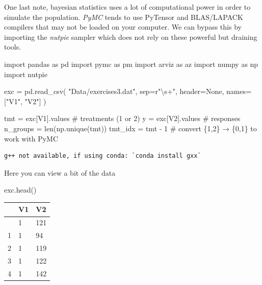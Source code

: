 \documentclass[
  letterpaper,
  DIV=11,
  numbers=noendperiod]{scrartcl}
\newenvironment{Shaded}{\begin{snugshade}}{\end{snugshade}}
\newcommand{\BuiltInTok}[1]{\textcolor[rgb]{0.00,0.23,0.31}{#1}}
\newcommand{\CommentTok}[1]{\textcolor[rgb]{0.37,0.37,0.37}{#1}}
\newcommand{\DecValTok}[1]{\textcolor[rgb]{0.68,0.00,0.00}{#1}}
\newcommand{\ImportTok}[1]{\textcolor[rgb]{0.00,0.46,0.62}{#1}}
\newcommand{\NormalTok}[1]{\textcolor[rgb]{0.00,0.23,0.31}{#1}}
\newcommand{\OperatorTok}[1]{\textcolor[rgb]{0.37,0.37,0.37}{#1}}
\newcommand{\StringTok}[1]{\textcolor[rgb]{0.13,0.47,0.30}{#1}}
\newcommand{\VariableTok}[1]{\textcolor[rgb]{0.07,0.07,0.07}{#1}}
\newcommand{\VerbatimStringTok}[1]{\textcolor[rgb]{0.13,0.47,0.30}{#1}}
\newcounter{none} %
\begin{document}
One last note, bayesian statistics uses a lot of computational power in
order to simulate the population. \emph{PyMC} tends to use PyTensor and
BLAS/LAPACK compilers that may not be loaded on your computer. We can
bypass this by importing the \emph{nutpie} sampler which does not rely
on these powerful but draining tools.

\begin{Shaded}
\begin{Highlighting}[]
\ImportTok{import}\NormalTok{ pandas }\ImportTok{as}\NormalTok{ pd}
\ImportTok{import}\NormalTok{ pymc }\ImportTok{as}\NormalTok{ pm}
\ImportTok{import}\NormalTok{ arviz }\ImportTok{as}\NormalTok{ az}
\ImportTok{import}\NormalTok{ numpy }\ImportTok{as}\NormalTok{ np}
\ImportTok{import}\NormalTok{ nutpie}


\NormalTok{exc }\OperatorTok{=}\NormalTok{ pd.read\_csv(}
    \StringTok{"Data/exercises3.dat"}\NormalTok{,}
\NormalTok{    sep}\OperatorTok{=}\VerbatimStringTok{r"}\DecValTok{\textbackslash{}s}\OperatorTok{+}\VerbatimStringTok{"}\NormalTok{,}
\NormalTok{    header}\OperatorTok{=}\VariableTok{None}\NormalTok{,}
\NormalTok{    names}\OperatorTok{=}\NormalTok{[}\StringTok{"V1"}\NormalTok{, }\StringTok{"V2"}\NormalTok{]}
\NormalTok{)}

\NormalTok{tmt }\OperatorTok{=}\NormalTok{ exc[}\StringTok{\textquotesingle{}V1\textquotesingle{}}\NormalTok{].values          }\CommentTok{\# treatments (1 or 2)}
\NormalTok{y }\OperatorTok{=}\NormalTok{ exc[}\StringTok{\textquotesingle{}V2\textquotesingle{}}\NormalTok{].values            }\CommentTok{\# responses}
\NormalTok{n\_groups }\OperatorTok{=} \BuiltInTok{len}\NormalTok{(np.unique(tmt))}
\NormalTok{tmt\_idx }\OperatorTok{=}\NormalTok{ tmt }\OperatorTok{{-}} \DecValTok{1}   \CommentTok{\# convert \{1,2\} → \{0,1\} to work with PyMC}
\end{Highlighting}
\end{Shaded}

\begin{verbatim}
g++ not available, if using conda: `conda install gxx`
\end{verbatim}

Here you can view a bit of the data

\begin{Shaded}
\begin{Highlighting}[]
\NormalTok{exc.head()}
\end{Highlighting}
\end{Shaded}

{\def\LTcaptype{none} %
\begin{longtable}[]{@{}lll@{}}
\toprule\noalign{}
& V1 & V2 \\
\midrule\noalign{}
\endhead
\bottomrule\noalign{}
\endlastfoot
0 & 1 & 121 \\
1 & 1 & 94 \\
2 & 1 & 119 \\
3 & 1 & 122 \\
4 & 1 & 142 \\
\end{longtable}
}
\end{document}
